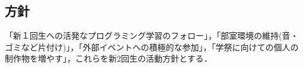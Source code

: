 \subsection*{\newGradeIfKouki{}\secondGrade{}方針}


「新１回生への活発なプログラミング学習のフォロー」，「部室環境の維持(音・ゴミなど片付け)」，「外部イベントへの積極的な参加」，「学祭に向けての個人の制作物を増やす」，これらを新2回生の活動方針とする．
